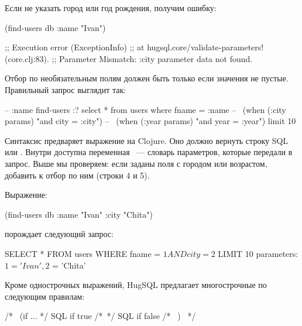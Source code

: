 Если не указать город или год рождения, получим ошибку:

\begin{english}
  \begin{clojure}
(find-users db {:name "Ivan"})

;; Execution error (ExceptionInfo)
;; at hugsql.core/validate-parameters! (core.clj:83).
;; Parameter Mismatch: :city parameter data not found.
  \end{clojure}
\end{english}

Отбор по необязательным полям должен быть только если значения не пустые. Правильный запрос выглядит так:

\begin{english}
  \begin{sql/lines}
-- :name find-users :?
select * from users
where fname = :name
--~ (when (:city params) "and city = :city")
--~ (when (:year params) "and year = :year")
limit 10
  \end{sql/lines}
\end{english}

Синтаксис \code{-{}-{}\~} предваряет выражение на Clojure. Оно должно вернуть строку SQL или . Внутри доступна переменная ~--- словарь параметров, которые передали в запрос. Выше мы проверяем: если заданы поля с городом или возрастом, добавить к  отбор по ним (строки 4 и 5).

Выражение:

\begin{english}
  \begin{clojure}
(find-users db {:name "Ivan" :city "Chita"})
  \end{clojure}
\end{english}

\noindent
порождает следующий запрос:

\begin{english}
  \begin{sql}
SELECT * FROM users
WHERE fname = $1
  AND city = $2
LIMIT 10
parameters: $1 = 'Ivan', $2 = 'Chita'
  \end{sql}
\end{english}

Кроме однострочных выражений, HugSQL предлагает многострочные по следующим правилам:

\begin{english}
  \begin{sql}
/*~ (if ... */
SQL if true
/*~*/
SQL if false
/*~ ) ~*/
  \end{sql}
\end{english}

